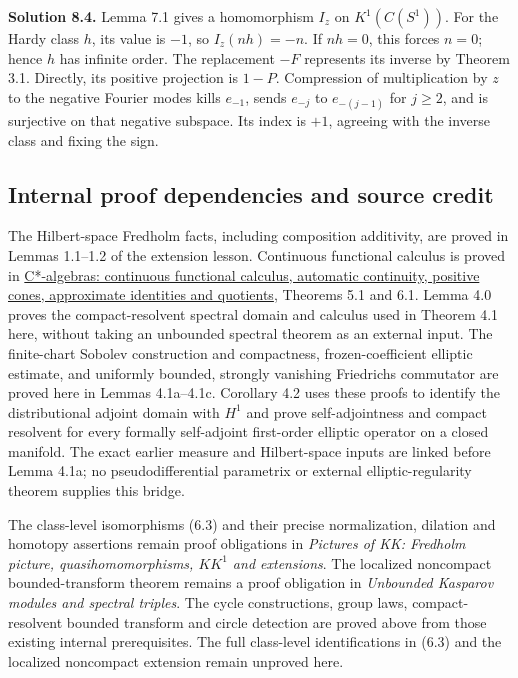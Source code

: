 \documentclass[
  11pt,
]{article}
\begin{document}
\textbf{Solution 8.4.} Lemma 7.1 gives a homomorphism \(I_z\) on
\(K^1(C(S^1))\). For the Hardy class \(h\), its value is \(-1\), so
\(I_z(nh)=-n\). If \(nh=0\), this forces \(n=0\); hence \(h\) has
infinite order. The replacement \(-F\) represents its inverse by Theorem
3.1. Directly, its positive projection is \(1-P\). Compression of
multiplication by \(z\) to the negative Fourier modes kills \(e_{-1}\),
sends \(e_{-j}\) to \(e_{-(j-1)}\) for \(j\geq2\), and is surjective on
that negative subspace. Its index is \(+1\), agreeing with the inverse
class and fixing the sign.

\subsection{Internal proof dependencies and source
credit}\label{internal-proof-dependencies-and-source-credit}

The Hilbert-space Fredholm facts, including composition additivity, are
proved in Lemmas 1.1--1.2 of the extension lesson. Continuous functional
calculus is proved in
\href{https://kokunoyumeto.github.io/open-math-courses/courses/foundations-of-von-neumann-algebras/c-star-algebras-continuous-functional-calculus-automatic-continuity-positive-cones.html}{C*-algebras:
continuous functional calculus, automatic continuity, positive cones,
approximate identities and quotients}, Theorems 5.1 and 6.1. Lemma 4.0
proves the compact-resolvent spectral domain and calculus used in
Theorem 4.1 here, without taking an unbounded spectral theorem as an
external input. The finite-chart Sobolev construction and compactness,
frozen-coefficient elliptic estimate, and uniformly bounded, strongly
vanishing Friedrichs commutator are proved here in Lemmas 4.1a--4.1c.
Corollary 4.2 uses these proofs to identify the distributional adjoint
domain with \(H^1\) and prove self-adjointness and compact resolvent for
every formally self-adjoint first-order elliptic operator on a closed
manifold. The exact earlier measure and Hilbert-space inputs are linked
before Lemma 4.1a; no pseudodifferential parametrix or external
elliptic-regularity theorem supplies this bridge.

The class-level isomorphisms (6.3) and their precise normalization,
dilation and homotopy assertions remain proof obligations in
\emph{Pictures of KK: Fredholm picture, quasihomomorphisms, \(KK^1\) and
extensions}. The localized noncompact bounded-transform theorem remains
a proof obligation in \emph{Unbounded Kasparov modules and spectral
triples}. The cycle constructions, group laws, compact-resolvent bounded
transform and circle detection are proved above from those existing
internal prerequisites. The full class-level identifications in (6.3)
and the localized noncompact extension remain unproved here.
\end{document}
